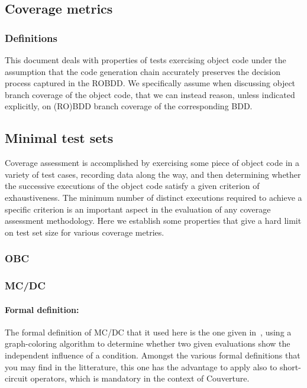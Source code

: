 \documentclass[a4paper,12pt,twoside]{article}
\newcommand{\couv}{{\sc Couverture}}
\begin{document}
\subsection{Coverage metrics}

\subsubsection{Definitions}


This document deals with properties of tests exercising object code under
the assumption that the code generation chain accurately preserves the
decision process captured in the ROBDD. We specifically assume when
discussing object branch coverage of the object code, that we can instead
reason, unless indicated explicitly, on (RO)BDD branch coverage
of the corresponding BDD.

\subsection{Minimal test sets}

Coverage assessment is accomplished by exercising some piece of object
code in a variety of test cases, recording data along the way, and
then determining whether the successive executions of the object code
satisfy a given criterion of exhaustiveness. The minimum number of distinct
executions required to achieve a specific criterion is an important
aspect in the evaluation of any coverage assessment methodology. Here
we establish some properties that give a hard limit on test set size
for various coverage metries.

\subsubsection{OBC}


\subsubsection{MC/DC}

\paragraph{Formal definition:}

The formal definition of MC/DC that it used here is the one given
in~\cite{ar0118}, using a graph-coloring algorithm to determine
whether two given evaluations show the independent influence of a
condition. Amongst the various formal definitions that you may find in
the litterature, this one has the advantage to apply also to
short-circuit operators, which is mandatory in the context of \couv{}.
\end{document}
